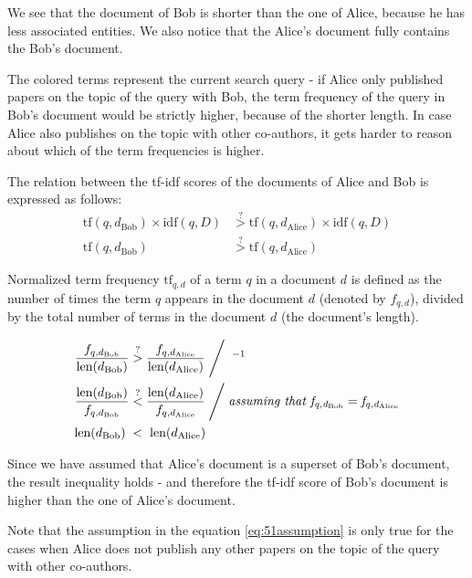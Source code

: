 We see that the document of Bob is shorter than the one of Alice, because he has less associated entities. We also notice that the Alice's document fully contains the Bob's document.
    
The colored terms represent the current search query - if Alice only published papers on the topic of the query with Bob, the term frequency of the 
query in Bob's document would be strictly higher, because of the shorter length.
In case Alice also publishes on the topic with other co-authors, it gets harder to reason about which of the term frequencies is higher.

The relation between the tf-idf scores of the documents of Alice and Bob is expressed as follows:
\begin{subequations}
\begin{align}
\text{tf}(q, d_{\text{Bob}}) \times \text{idf}(q, D) &\stackrel{?}{>} \text{tf}(q, d_{\text{Alice}}) \times \text{idf}(q, D) \\
\text{tf}(q, d_{\text{Bob}}) &\stackrel{?}{>} \text{tf}(q, d_{\text{Alice}})
\end{align}
\end{subequations}

Normalized term frequency $\text{tf}_{q,d}$ of a term $q$ in a document $d$ is defined as the number of times the term $q$ appears in the document $d$ (denoted by $f_{q,d}$),
divided by the total number of terms in the document $d$ (the document's length).

\begin{subequations}
\begin{align}
\frac{f_{q, d_{\text{Bob}}}}{\text{len}(d_{\text{Bob}})} &\stackrel{?}{>} \frac{f_{q, d_{\text{Alice}}}}{\text{len}(d_{\text{Alice}})} \Biggm/ \;^{-1} \\
\frac{\text{len}(d_{\text{Bob}})}{f_{q, d_{\text{Bob}}}} &\stackrel{?}{<} \frac{\text{len}(d_{\text{Alice}})}{f_{q, d_{\text{Alice}}}} \Biggm/ \textit{assuming that } \mathit{f_{q, d_{\text{Bob}}} = f_{q, d_{\text{Alice}}}} \label{eq:51assumption}\\
\text{len}(d_{\text{Bob}}) \;&<\;\text{len}(d_{\text{Alice}})
\end{align}
\end{subequations}

Since we have assumed that Alice's document is a superset of Bob's document, the result inequality holds - and therefore the tf-idf score of Bob's document is higher than the one of Alice's document.

Note that the assumption in the equation \ref{eq:51assumption} is only true for the cases when Alice does not publish any other papers on the topic of the query with other co-authors.

